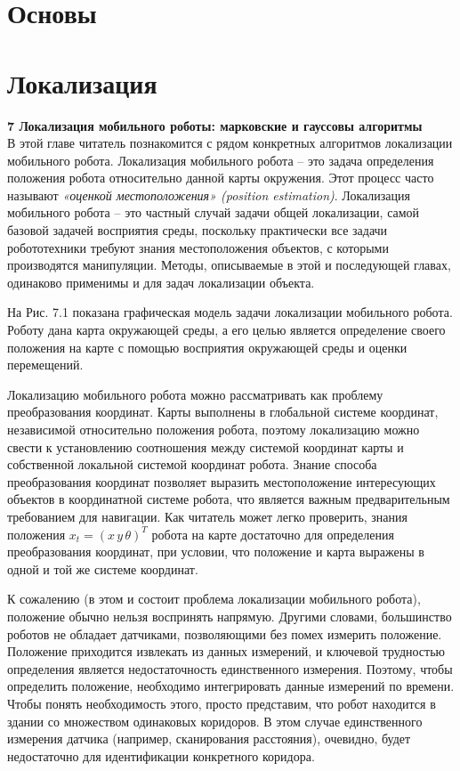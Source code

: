 \documentclass[10pt,a4paper]{article}
\begin{document}
\part{Основы}

\part{Локализация}

\textbf{7 Локализация мобильного роботы: марковские и гауссовы алгоритмы}\\

В этой главе читатель познакомится с рядом конкретных алгоритмов локализации мобильного робота. Локализация мобильного робота – это задача определения положения робота относительно данной карты окружения. Этот процесс часто называют \textit{«оценкой местоположения» (position estimation)}. Локализация мобильного робота – это частный случай задачи общей локализации, самой базовой задачей восприятия среды, поскольку практически все задачи робототехники требуют знания местоположения объектов, с которыми производятся манипуляции. Методы, описываемые в этой и последующей главах, одинаково применимы и для задач локализации объекта. 

На Рис. 7.1 показана графическая модель задачи локализации мобильного робота. Роботу дана карта окружающей среды, а его целью является определение своего положения на карте с помощью восприятия окружающей среды и оценки перемещений.

Локализацию мобильного робота можно рассматривать как проблему преобразования координат. Карты выполнены в глобальной системе координат, независимой относительно положения робота, поэтому локализацию можно свести к установлению соотношения между системой координат карты и собственной локальной системой координат робота. Знание способа преобразования координат позволяет выразить местоположение интересующих объектов в координатной системе робота, что является важным предварительным требованием для навигации. Как читатель может легко проверить, знания положения $x_t = (x\,y\,\theta)^T$ робота на карте достаточно для определения преобразования координат, при условии, что положение и карта выражены в одной и той же системе координат. 

К сожалению (в этом и состоит проблема локализации мобильного робота), положение обычно нельзя воспринять напрямую. Другими словами, большинство роботов не обладает датчиками, позволяющими без помех измерить положение. Положение приходится извлекать из данных измерений, и ключевой трудностью определения является недостаточность единственного измерения. Поэтому, чтобы определить положение, необходимо интегрировать данные измерений по времени. Чтобы понять необходимость этого, просто представим, что робот находится в здании со множеством одинаковых коридоров. В этом случае единственного измерения датчика (например, сканирования расстояния), очевидно, будет недостаточно для идентификации конкретного коридора.
\end{document}
